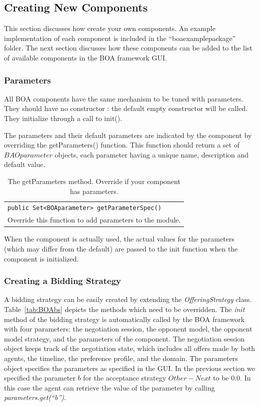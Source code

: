 \documentclass[]{article}
\begin{document}
\subsection{Creating New Components}
This section discusses how create your own components. An example implementation of each component is included in the ``boaexamplepackage'' folder. The next section discusses how these components can be added to the list of available components in the BOA framework GUI.

\subsubsection{Parameters}
All BOA components have the same mechanism to be tuned with parameters. They should have no constructor : the default empty constructor will be called. They initialize through a call to init().

The parameters and their default parameters are indicated by the component by overriding the getParameters() function. This function should return a set of $BAOparameter$ objects, each parameter having a unique name, description and default value.


\begin{table}[h]
\begin{tabular}{m{}}
\hline
\texttt{public Set<BOAparameter> getParameterSpec() }\\
 Override this function to add parameters to the module.\\
\hline
\end{tabular}
\caption{The getParameters method. Override if your component has parameters.}
\label{tab:parameters}
\end{table}


When the component is actually used, the actual values for the parameters (which may differ from the default) are passed to the init function when the component is initialized.

\subsubsection{Creating a Bidding Strategy}
A bidding strategy can be easily created by extending the \textit{OfferingStrategy} class. Table~\ref{tab:BOAbs} depicts the methods which need to be overridden. The \textit{init} method of the bidding strategy is automatically called by the BOA framework with four parameters: the negotiation session, the opponent model, the opponent model strategy, and the parameters of the component. The negotiation session object keeps track of the negotiation state, which includes all offers made by both agents, the timeline, the preference profile, and the domain. The parameters object specifies the parameters as specified in the GUI. In the previous section we specified the parameter $b$ for the acceptance strategy $Other - Next$ to be 0.0. In this case the agent can retrieve the value of the parameter by calling \textit{parameters.get(``b'')}.
\end{document}
